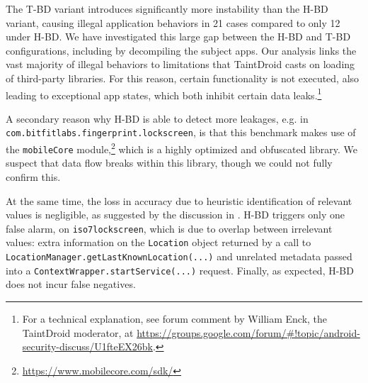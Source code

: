 
The T-BD variant introduces significantly more instability than the H-BD variant, causing illegal application behaviors in 21 cases compared to only 12 under H-BD. We have investigated this large gap between the H-BD and T-BD configurations, including by decompiling the subject apps. Our analysis links the vast majority of illegal behaviors to limitations that
TaintDroid casts on loading of third-party libraries. For this reason, certain functionality is not executed, also leading to exceptional app states, which both inhibit certain data leaks.\footnote{
	For a technical explanation, see forum comment by William Enck, the TaintDroid moderator, at \href{https://groups.google.com/forum/\#!topic/android-security-discuss/U1fteEX26bk}{https://groups.google.com/forum/\#!topic/android-security-discuss/U1fteEX26bk}.
}

A secondary reason why H-BD is able to detect more leakages, e.g. in {\tt com.bitfitlabs.fingerprint.lockscreen}, is that this benchmark makes use of the {\tt mobileCore} module,\footnote{
\href{https://www.mobilecore.com/sdk/}{https://www.mobilecore.com/sdk/}
} which is a highly optimized and obfuscated library. We suspect that data flow breaks within this library, though we could not fully confirm this.

At the same time, the loss in accuracy due to heuristic identification of relevant values is negligible, as suggested by the discussion in . H-BD triggers only one false alarm, on {\tt iso7lockscreen},
which is due to overlap between irrelevant values: extra information on the {\tt Location} object returned by a call to {\tt LocationManager.getLastKnownLocation(...)} and unrelated metadata passed into a {\tt ContextWrapper.startService(...)} request.  Finally, as expected, H-BD does not incur false negatives.